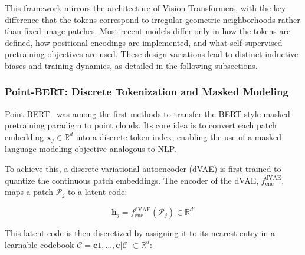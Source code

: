 This framework mirrors the architecture of Vision Transformers, with the key difference that the tokens correspond to irregular geometric neighborhoods rather than fixed image patches. Most recent models differ only in how the tokens are defined, how positional encodings are implemented, and what self-supervised pretraining objectives are used. These design variations lead to distinct inductive biases and training dynamics, as detailed in the following subsections.


\subsubsection{Point-BERT: Discrete Tokenization and Masked Modeling}
\label{sssec:pointbert}

Point-BERT~\cite{pbert} was among the first methods to transfer the BERT-style masked pretraining paradigm to point clouds. Its core idea is to convert each patch embedding $\mathbf{x}_j \in \mathbb{R}^d$ into a discrete token index, enabling the use of a masked language modeling objective analogous to NLP.

To achieve this, a discrete variational autoencoder (dVAE) is first trained to quantize the continuous patch embeddings. The encoder of the dVAE, $f_{\text{enc}}^{\text{dVAE}}$, maps a patch $\mathcal{P}_j$ to a latent code:

\begin{equation}
    \mathbf{h}_j = f_{\text{enc}}^{\text{dVAE}}(\mathcal{P}_j) \in \mathbb{R}^{d'}
\end{equation}

This latent code is then discretized by assigning it to its nearest entry in a learnable codebook $\mathcal{C} = { \mathbf{c}1, \dots, \mathbf{c}{|\mathcal{C}|} } \subset \mathbb{R}^d$:

